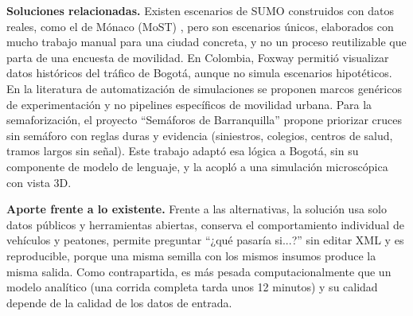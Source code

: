 \textbf{Soluciones relacionadas.} Existen escenarios de SUMO construidos con datos reales, como el de Mónaco (MoST) \cite{codeca_harri_lust_2017,codeca_harri_most_2018}, pero son escenarios únicos, elaborados con mucho trabajo manual para una ciudad concreta, y no un proceso reutilizable que parta de una encuesta de movilidad. En Colombia, Foxway \cite{10554_16495} permitió visualizar datos históricos del tráfico de Bogotá, aunque no simula escenarios hipotéticos. En la literatura de automatización de simulaciones \cite{6465286,6301221} se proponen marcos genéricos de experimentación y no pipelines específicos de movilidad urbana. Para la semaforización, el proyecto “Semáforos de Barranquilla” propone priorizar cruces sin semáforo con reglas duras y evidencia (siniestros, colegios, centros de salud, tramos largos sin señal). Este trabajo adaptó esa lógica a Bogotá, sin su componente de modelo de lenguaje, y la acopló a una simulación microscópica con vista 3D.

\textbf{Aporte frente a lo existente.} Frente a las alternativas, la solución usa solo datos públicos y herramientas abiertas, conserva el comportamiento individual de vehículos y peatones, permite preguntar “¿qué pasaría si...?” sin editar XML y es reproducible, porque una misma semilla con los mismos insumos produce la misma salida. Como contrapartida, es más pesada computacionalmente que un modelo analítico (una corrida completa tarda unos 12 minutos) y su calidad depende de la calidad de los datos de entrada.

